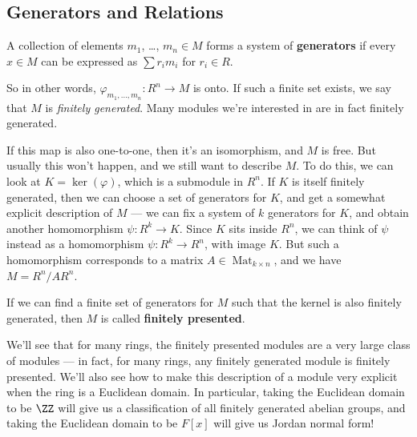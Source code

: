 \subsection{Generators and Relations}

\vspace{0.75em}

\begin{definition}
    A collection of elements $m_1$, \ldots, $m_n \in M$ forms a system of \textbf{generators} if every $x \in M$ can be expressed as $\sum r_im_i$ for $r_i \in R$. 
\end{definition}

So in other words, $\varphi_{m_1, \ldots, m_n} : R^n \to M$ is onto. If such a finite set exists, we say that $M$ is \emph{finitely generated}. Many modules we're interested in are in fact finitely generated. 

If this map is also one-to-one, then it's an isomorphism, and $M$ is free. But usually this won't happen, and we still want to describe $M$. To do this, we can look at $K = \ker(\varphi)$, which is a submodule in $R^n$. If $K$ is itself finitely generated, then we can choose a set of generators for $K$, and get a somewhat explicit description of $M$ --- we can fix a system of $k$ generators for $K$, and obtain another homomorphism $\psi : R^k \to K$. Since $K$ sits inside $R^n$, we can think of $\psi$ instead as a homomorphism $\psi : R^k \to R^n$, with image $K$. But such a homomorphism corresponds to a matrix $A \in \operatorname{Mat}_{k\times n}$, and we have $M = R^n/AR^n$. 

\begin{definition}
If we can find a finite set of generators for $M$ such that the kernel is also finitely generated, then $M$ is called \textbf{finitely presented}. 
\end{definition}

We'll see that for many rings, the finitely presented modules are a very large class of modules --- in fact, for many rings, any finitely generated module is finitely presented. We'll also see how to make this description of a module very explicit when the ring is a Euclidean domain. In particular, taking the Euclidean domain to be $\ZZ$ will give us a classification of all finitely generated abelian groups, and taking the Euclidean domain to be $F[x]$ will give us Jordan normal form!



